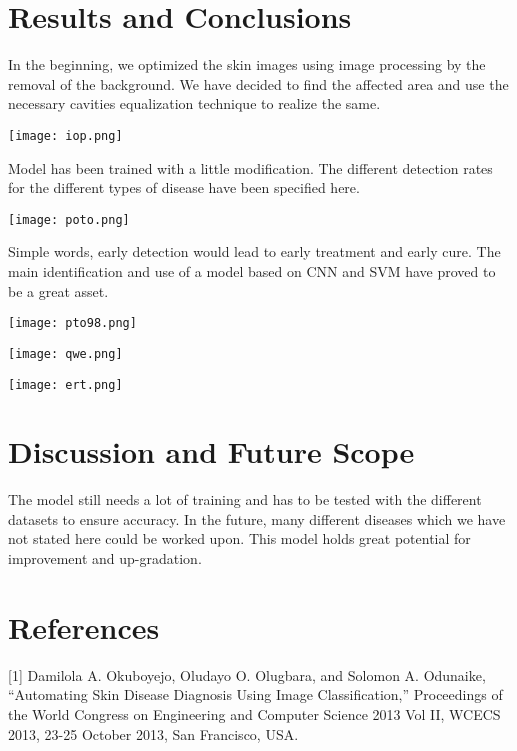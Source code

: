 \documentclass{article}
\begin{document}
\section{Results and Conclusions}


In the beginning, we optimized the skin images using image processing by the removal of the background. We have decided to find the affected area and use the necessary cavities equalization technique to realize the same.

\begin{center}
    \texttt{[image: iop.png]}
\end{center}

\subsubsectionThe{} Model has been trained with a little modification. The different detection rates for the different types of disease have been specified here.

\begin{center}
    \texttt{[image: poto.png]}
\end{center}


\subsectionIn{} Simple words, early detection would lead to early treatment and early cure. The main identification and use of a model based on CNN and SVM have proved to be a great asset.

\begin{center}
    \texttt{[image: pto98.png]}
\end{center}

\begin{center}
    \texttt{[image: qwe.png]}
\end{center}

\begin{center}
    \texttt{[image: ert.png]}
\end{center}
\section{Discussion and Future Scope}


The model still needs a lot of training and has to be tested with the different datasets to ensure accuracy. In the future, many different diseases which we have not stated here could be worked upon. This model holds great potential for improvement and up-gradation.

\section{References}


[1] Damilola A. Okuboyejo, Oludayo O. Olugbara, and Solomon A. Odunaike, “Automating Skin Disease Diagnosis Using Image Classification,” Proceedings of the World Congress on Engineering and Computer Science 2013 Vol II, WCECS 2013, 23-25 October 2013, San Francisco, USA.
\end{document}
